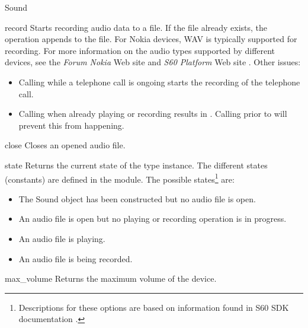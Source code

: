 \begin{classdesc*}{Sound}
\begin{methoddesc}[Sound]{record}{}
Starts recording audio data to a file. If the file already exists, the 
operation appends to the file. For Nokia devices, WAV is typically supported 
for recording. For more information on the audio types supported by 
different devices, see the \textit{Forum Nokia} Web site 
\cite{S60AudioVideo} and \textit{S60 Platform} Web site 
\cite{S60Developers}. Other issues:

\begin{itemize}
\item Calling  while a telephone call is ongoing starts the recording of the telephone call. 
\item Calling  when already playing or recording results in . Calling  prior to  will prevent this from happening.
\end{itemize}
\end{methoddesc}

\begin{methoddesc}[Sound]{close}{}
Closes an opened audio file.
\end{methoddesc}

\begin{methoddesc}[Sound]{state}{}
Returns the current state of the  type instance. The different 
states (constants) are defined in the  module. The possible 
states\footnote{Descriptions for these options are based on information 
found in S60 SDK documentation \cite{S60Doc}.} are:

\begin{itemize}
\item {} \newline
The \textsf{Sound} object has been constructed but no audio file is open.
\item {} \newline
An audio file is open but no playing or recording operation is in progress.
\item {} \newline
An audio file is playing.
\item {} \newline
An audio file is being recorded.
\end{itemize}
\end{methoddesc}

\begin{methoddesc}[Sound]{max_volume}{}
Returns the maximum volume of the device.
\end{methoddesc}


\end{classdesc*}
